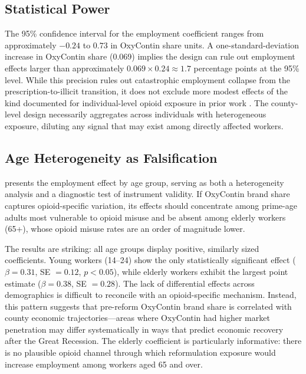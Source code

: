 \documentclass[12pt]{article}
\begin{document}
\subsection{Statistical Power}

The 95\% confidence interval for the employment coefficient ranges from approximately $-0.24$ to $0.73$ in OxyContin share units. A one-standard-deviation increase in OxyContin share (0.069) implies the design can rule out employment effects larger than approximately $0.069 \times 0.24 \approx 1.7$ percentage points at the 95\% level. While this precision rules out catastrophic employment collapse from the prescription-to-illicit transition, it does not exclude more modest effects of the kind documented for individual-level opioid exposure in prior work \citep{krueger2017, harris2020}. The county-level design necessarily aggregates across individuals with heterogeneous exposure, diluting any signal that may exist among directly affected workers.

\subsection{Age Heterogeneity as Falsification}

 presents the employment effect by age group, serving as both a heterogeneity analysis and a diagnostic test of instrument validity. If OxyContin brand share captures opioid-specific variation, its effects should concentrate among prime-age adults most vulnerable to opioid misuse and be absent among elderly workers (65+), whose opioid misuse rates are an order of magnitude lower.

The results are striking: all age groups display positive, similarly sized coefficients. Young workers (14--24) show the only statistically significant effect ($\beta = 0.31$, SE $= 0.12$, $p < 0.05$), while elderly workers exhibit the largest point estimate ($\beta = 0.38$, SE $= 0.28$). The lack of differential effects across demographics is difficult to reconcile with an opioid-specific mechanism. Instead, this pattern suggests that pre-reform OxyContin brand share is correlated with county economic trajectories---areas where OxyContin had higher market penetration may differ systematically in ways that predict economic recovery after the Great Recession. The elderly coefficient is particularly informative: there is no plausible opioid channel through which reformulation exposure would increase employment among workers aged 65 and over.
\end{document}
